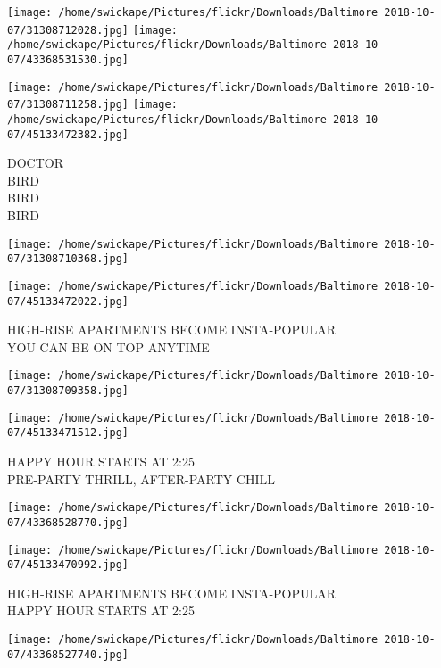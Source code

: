 \documentclass[10pt,letterpaper]{article}
\begin{document}
\texttt{[image: /home/swickape/Pictures/flickr/Downloads/Baltimore 2018-10-07/31308712028.jpg]}
\texttt{[image: /home/swickape/Pictures/flickr/Downloads/Baltimore 2018-10-07/43368531530.jpg]}

\texttt{[image: /home/swickape/Pictures/flickr/Downloads/Baltimore 2018-10-07/31308711258.jpg]}
\texttt{[image: /home/swickape/Pictures/flickr/Downloads/Baltimore 2018-10-07/45133472382.jpg]}

DOCTOR\\
BIRD\\
BIRD\\
BIRD\\
\pagebreak

\texttt{[image: /home/swickape/Pictures/flickr/Downloads/Baltimore 2018-10-07/31308710368.jpg]}

\vspace{0.25in}
\texttt{[image: /home/swickape/Pictures/flickr/Downloads/Baltimore 2018-10-07/45133472022.jpg]}

HIGH{-}RISE APARTMENTS BECOME INSTA{-}POPULAR\\
YOU CAN BE ON TOP ANYTIME\\
\pagebreak

\texttt{[image: /home/swickape/Pictures/flickr/Downloads/Baltimore 2018-10-07/31308709358.jpg]}

\vspace{0.25in}
\texttt{[image: /home/swickape/Pictures/flickr/Downloads/Baltimore 2018-10-07/45133471512.jpg]}

HAPPY HOUR STARTS AT 2:25\\
PRE{-}PARTY THRILL, AFTER{-}PARTY CHILL\\
\pagebreak

\texttt{[image: /home/swickape/Pictures/flickr/Downloads/Baltimore 2018-10-07/43368528770.jpg]}

\vspace{0.25in}
\texttt{[image: /home/swickape/Pictures/flickr/Downloads/Baltimore 2018-10-07/45133470992.jpg]}

HIGH{-}RISE APARTMENTS BECOME INSTA{-}POPULAR\\
HAPPY HOUR STARTS AT 2:25\\
\pagebreak

\texttt{[image: /home/swickape/Pictures/flickr/Downloads/Baltimore 2018-10-07/43368527740.jpg]}
\end{document}
